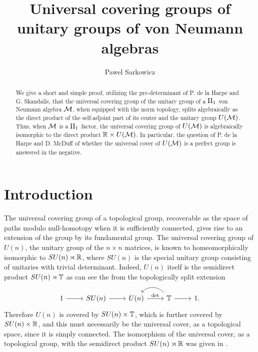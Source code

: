 \documentclass{amsart}
\begin{document}
\title[Universal covering groups of unitary groups of W*-algebras]{Universal covering groups of unitary groups of von Neumann algebras}

\author[Pawel Sarkowicz]{Pawel Sarkowicz}
\address[Pawel Sarkowicz]{Department of Pure Mathematics, University of Waterloo,  N2L 3G1, Canada}

  \begin{abstract}
  We give a short and simple proof, utilizing the pre-determinant of P. de la Harpe and G. Skandalis, that the universal covering group of the unitary group of a $\text{II}_1$ von Neumann algebra $\mathcal{M}$, when equipped with the norm topology, splits algebraically as the direct product of the self-adjoint part of its center and the unitary group $U(\mathcal{M})$. Thus, when $\mathcal{M}$ is a $\text{II}_1$ factor, the universal covering group of $U(\mathcal{M})$ is algebraically isomorphic to the direct product $\mathbb{R} \times U(\mathcal{M})$.
  In particular, the question of P. de la Harpe and D. McDuff of whether the universal cover of $U(\mathcal{M})$ is a perfect group is answered in the negative.
  \end{abstract}

  \maketitle
  \tableofcontents
  
 \section{Introduction}
  
The universal covering group of a topological group, recoverable as the space of paths modulo null-homotopy when it is sufficiently connected, gives rise to an extension of the group by its fundamental group. 
  The universal covering group of $U(n)$, the unitary group of the $n \times n$ matrices, is known to homeomorphically isomorphic to $SU(n) \rtimes \mathbb{R}$, where $SU(n)$ is the special unitary group consisting of unitaries with trivial determinant.
Indeed, $U(n)$ itself is the semidirect product $SU(n) \rtimes \mathbb{T}$ as can see the from the topologically split extension
\begin{equation}\label{eq:U(n) splitting}
\begin{tikzcd}
1 \arrow[r] & SU(n) \arrow[r] & U(n) \arrow[r, "\det"] & \bT \arrow[l, bend right=49] \arrow[r] & 1.
\end{tikzcd}
\end{equation}
Therefore $U(n)$ is covered by $SU(n) \times \mathbb{T}$, which is further covered by $SU(n) \times \mathbb{R}$, and this must necessarily be the universal cover, as a topological space, since it is simply connected.
The isomorphism of the universal cover, as a topological group, with the semidirect product $SU(n) \rtimes \mathbb{R}$ was given in \cite{AguilarSocolovsky00}.
  
\end{document}
